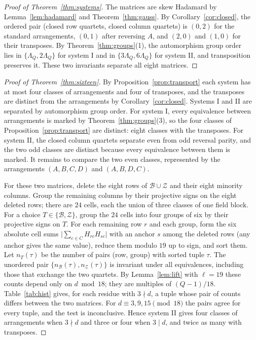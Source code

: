 \documentclass[11pt]{article}
\theoremstyle{plain}
\theoremstyle{definition}
\theoremstyle{remark}
\newcommand{\abs}[1]{\lvert#1\rvert}
\begin{document}
\begin{proof}[Proof of Theorem~\ref{thm:systems}]
The matrices are skew Hadamard by Lemma~\ref{lem:hadamard} and
Theorem~\ref{thm:gauss}. By Corollary~\ref{cor:closed}, the ordered pair
(closed row quartets, closed column quartets) is $(0,2)$ for the standard
arrangements, $(0,1)$ after reversing $A$, and $(2,0)$ and $(1,0)$ for their
transposes. By Theorem~\ref{thm:groups}(1), the automorphism group order
lies in $\{\Lambda_Q,2\Lambda_Q\}$ for system I and in $\{3\Lambda_Q,6\Lambda_Q\}$ for system II,
and transposition preserves it. These two invariants separate all eight
matrices.
\end{proof}

\begin{proof}[Proof of Theorem~\ref{thm:sixteen}]
By Proposition~\ref{prop:transport} each system has at most four classes of
arrangements and four of transposes, and the transposes are distinct from the
arrangements by Corollary~\ref{cor:closed}. Systems I and II are separated
by automorphism group order. For system I, every equivalence between
arrangements is marked by Theorem~\ref{thm:groups}(3), so the four classes
of Proposition~\ref{prop:transport} are distinct: eight classes with the
transposes. For system II, the closed column quartets separate even from odd
reversal parity, and the two odd classes are distinct because every
equivalence between them is marked. It remains to compare the two even
classes, represented by the arrangements $(A,B,C,D)$ and $(A,B,D,C)$.

For these two matrices, delete the eight rows of $\mathcal B\cup\mathcal Z$
and their eight minority columns. Group the remaining columns by their
projective signs on the eight deleted rows; there are $24$ cells, each the
union of three classes of one field block. For a choice $T\in\{\mathcal B,
\mathcal Z\}$, group the $24$ cells into four groups of six by their
projective signs on $T$. For each remaining row $r$ and each group, form the
six absolute cell sums $\abs{\sum_{c\in C}H_{rc}H_{sc}}$ with an anchor $s$
among the deleted rows (any anchor gives the same value), reduce them modulo
$19$ up to sign, and sort them. Let $n_T(\tau)$ be the number of pairs (row,
group) with sorted tuple $\tau$. The unordered pair
$\{n_{\mathcal B}(\tau),n_{\mathcal Z}(\tau)\}$ is invariant under all
equivalences, including those that exchange the two quartets. By
Lemma~\ref{lem:lift} with $\ell=19$ these counts depend only on $d\bmod18$;
they are multiples of $(Q-1)/18$. Table~\ref{tab:hist} gives, for each
residue with $3\nmid d$, a tuple whose pair of counts differs between the two
matrices. For $d\equiv3,9,15\pmod{18}$ the pairs agree for every tuple, and
the test is inconclusive. Hence system II gives four classes of arrangements
when $3\nmid d$ and three or four when $3\mid d$, and twice as many with
transposes.
\end{proof}
\end{document}
